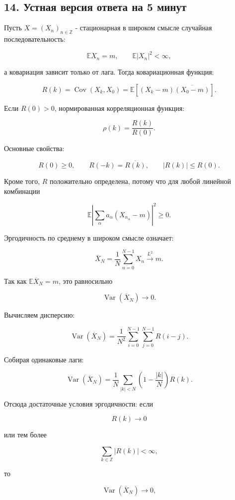 \documentclass[
  11pt,
  a4paper,
]{article}
\begin{document}
\subsection{14. Устная версия ответа на 5
минут}\label{ux443ux441ux442ux43dux430ux44f-ux432ux435ux440ux441ux438ux44f-ux43eux442ux432ux435ux442ux430-ux43dux430-5-ux43cux438ux43dux443ux442}

Пусть \(X=(X_n)_{n\in\mathbb Z}\) - стационарная в широком смысле
случайная последовательность:

\[
\mathbb EX_n=m,
\qquad
\mathbb E|X_n|^2<\infty,
\]

а ковариация зависит только от лага. Тогда ковариационная функция:

\[
R(k)=\operatorname{Cov}(X_k,X_0)
=
\mathbb E[(X_k-m)\overline{(X_0-m)}].
\]

Если \(R(0)>0\), нормированная корреляционная функция:

\[
\rho(k)=\frac{R(k)}{R(0)}.
\]

Основные свойства:

\[
R(0)\ge0,
\qquad
R(-k)=\overline{R(k)},
\qquad
|R(k)|\le R(0).
\]

Кроме того, \(R\) положительно определена, потому что для любой линейной
комбинации

\[
\mathbb E\left|\sum_\alpha a_\alpha(X_{n_\alpha}-m)\right|^2\ge0.
\]

Эргодичность по среднему в широком смысле означает:

\[
\overline X_N=\frac1N\sum_{n=0}^{N-1}X_n
\xrightarrow{L^2}
m.
\]

Так как \(\mathbb E\overline X_N=m\), это равносильно

\[
\operatorname{Var}(\overline X_N)\to0.
\]

Вычисляем дисперсию:

\[
\operatorname{Var}(\overline X_N)
=
\frac1{N^2}\sum_{i=0}^{N-1}\sum_{j=0}^{N-1}R(i-j).
\]

Собирая одинаковые лаги:

\[
\operatorname{Var}(\overline X_N)
=
\frac1N\sum_{|k|<N}
\left(1-\frac{|k|}{N}\right)R(k).
\]

Отсюда достаточные условия эргодичности: если

\[
R(k)\to0
\]

или тем более

\[
\sum_{k\in\mathbb Z}|R(k)|<\infty,
\]

то

\[
\operatorname{Var}(\overline X_N)\to0,
\]
\end{document}
